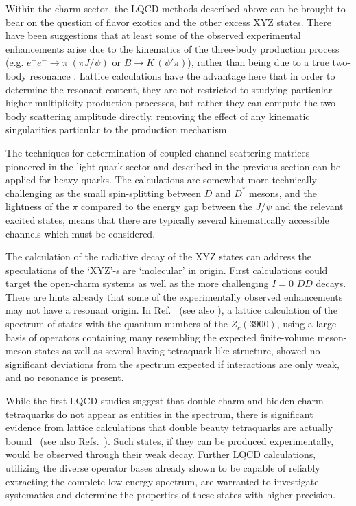 Within the charm sector, the LQCD methods described above can be brought to bear on the question of flavor exotics and the other excess XYZ states. There have been suggestions that at least some of the observed experimental enhancements arise due to the kinematics of the three-body production process (e.g. $e^+e^- \to \pi \; (\pi J/\psi) $ or $B \to K \, (\psi' \pi)$), rather than being due to a true two-body resonance \cite{Szczepaniak:2015eza}. Lattice calculations have the advantage here that in order to determine the resonant content, they are not restricted to studying particular higher-multiplicity production processes, but rather they can compute the two-body scattering amplitude directly, removing the effect of any kinematic singularities particular to the production mechanism.


The techniques for determination of coupled-channel scattering matrices pioneered in the light-quark sector and described in the previous section can be applied for heavy quarks. The calculations are somewhat more technically challenging as the small spin-splitting between $D$ and $D^*$ mesons, and the lightness of the $\pi$ compared to the energy gap between the $J/\psi$ and the relevant excited states, means that there are typically several kinematically accessible channels which must be considered.

The calculation of the radiative decay of the XYZ states can address the speculations of the `XYZ'-s are `molecular' in origin. First calculations could target the open-charm systems as well as the more challenging $I=0$ $D\bar{D}$ decays.
%
There are hints already that some of the experimentally observed enhancements may not have a resonant origin. In Ref.~\cite{Cheung:2017tnt} (see also \cite{Prelovsek:2014swa}), a lattice calculation of the spectrum of states with the quantum numbers of the $Z_c(3900)$, using a large basis of operators containing many resembling the expected finite-volume meson-meson states as well as several having tetraquark-like structure, showed no significant deviations from the spectrum expected if interactions are only weak, and no resonance is present. 

While the first LQCD studies suggest that double charm and hidden charm tetraquarks do not appear as entities in the spectrum, there is significant evidence from lattice calculations that double beauty tetraquarks are
actually {bound}~\cite{Francis:2016hui,Junnarkar:2018twb,Leskovec:2019ioa} (see also Refs.~\cite{Hughes:2017xie,Francis:2018jyb}). Such states, if they can be produced experimentally, would be observed through their weak decay. Further LQCD calculations, utilizing the diverse operator bases already shown to be capable of  reliably extracting the complete low-energy spectrum, are warranted to investigate systematics and determine the properties of these states with higher precision.

